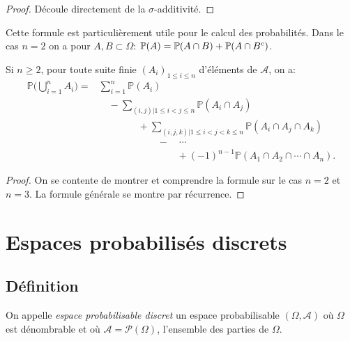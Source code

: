 \begin{proof}
	Découle directement de la $\sigma$-additivité. \end{proof}

\begin{remark}
Cette formule est particulièrement utile pour le calcul des probabilités. Dans le cas $n=2$ on a pour $A,B \subset \Omega$: $\P(A) = \P(A\cap B) + \P(A\cap B^c)$.
\end{remark}
\pl{\pagebreak[4]}

\sld{\vfill\pagebreak[5]}%


\begin{proposition}
Si $n \geq 2$, pour toute suite finie $(A_i)_{1 \leq i \leq n}$ d'éléments de $\mathcal{A}$, on a:
\begin{align*}
	\mathbb{P} \Big( \bigcup_{i=1}^n A_i \Big) =  & \sum_{i=1}^n \mathbb{P} (A_i) \\ &\quad -   \sum_{ (i,j) | 1 \leq i < j \leq n} \mathbb{P} (A_i \cap A_j)\\ & \qquad\qquad +  \sum_{(i,j,k) | 1 \leq i < j < k \leq n} \mathbb{P} (A_i \cap A_j \cap A_k) \\ &\qquad \qquad\qquad - \quad \cdots \quad  \\ & \qquad\qquad\qquad\qquad + (-1)^{n-1} \mathbb{P} (A_1 \cap A_2 \cap \cdots \cap A_n).
\end{align*}

\end{proposition}

\begin{proof}
On se contente de montrer et comprendre la formule sur le cas $n=2$ et $n=3$. La formule générale se montre par récurrence.
		\pl{\rep{5cm}}
\end{proof}

\section{Espaces probabilisés discrets}

\subsection{Définition}

\begin{definition}
On appelle \emph{espace probabilisable discret} un espace probabilisable  $(\Omega,\mathcal{A})$ où $\Omega$ est dénombrable et où $\mathcal{A}= \mathcal{P} (\Omega)$, l'ensemble des parties de $\Omega$.  
\end{definition}

